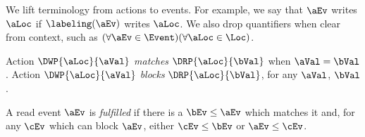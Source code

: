 We lift terminology from actions to events.  For example, we say that $\aEv$
writes $\aLoc$ if $\labeling(\aEv)$ writes $\aLoc$.  We also drop quantifiers
when clear from context, such as
$(\forall\aEv\in\Event)(\forall\aLoc\in\Loc)$.

\begin{definition}
  \label{def:fulfilled}
  Action $\DWP{\aLoc}{\aVal}$ \emph{matches} $\DRP{\aLoc}{\bVal}$ when $\aVal=\bVal$.
  Action $\DWP{\aLoc}{\aVal}$ \emph{blocks} $\DRP{\aLoc}{\bVal}$, for any
  $\aVal$, $\bVal$.
  

  A read event $\aEv$ is \emph{fulfilled} if there is a $\bEv\le\aEv$ which
  matches it and, for any $\cEv$ which can block $\aEv$, either $\cEv\le\bEv$
  or $\aEv\le\cEv$.

\end{definition}

